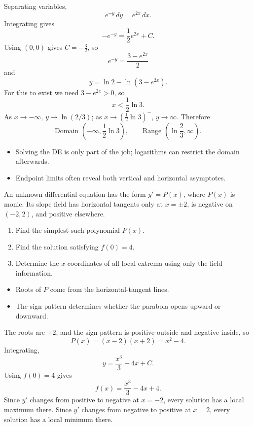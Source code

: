 \begin{solution}
Separating variables,
\[
e^{-y}\,dy=e^{2x}\,dx.
\]
Integrating gives
\[
-e^{-y}=\frac12e^{2x}+C.
\]
Using $(0,0)$ gives $C=-\frac32$, so
\[
e^{-y}=\frac{3-e^{2x}}{2}
\]
and
\[
\boxed{y=\ln 2-\ln(3-e^{2x})}.
\]
For this to exist we need $3-e^{2x}>0$, so
\[
\boxed{x<\frac12\ln3}.
\]
As $x\to-\infty$, $y\to\ln(2/3)$; as $x\to(\frac12\ln3)^-$, $y\to\infty$. Therefore
\[
\boxed{\text{Domain } \left(-\infty,\frac12\ln3\right), \qquad \text{Range } \left(\ln\frac23,\infty\right).}
\]
\end{solution}

\begin{takeaways}
\begin{itemize}[leftmargin=*]
    \item Solving the DE is only part of the job; logarithms can restrict the domain afterwards.
    \item Endpoint limits often reveal both vertical and horizontal asymptotes.
\end{itemize}
\end{takeaways}

\begin{problem}
An unknown differential equation has the form $y'=P(x)$, where $P(x)$ is monic. Its slope field has horizontal tangents only at $x=\pm2$, is negative on $(-2,2)$, and positive elsewhere.
\begin{enumerate}
    \item[\textbf{i}] Find the simplest such polynomial $P(x)$.
    \item[\textbf{ii}] Find the solution satisfying $f(0)=4$.
    \item[\textbf{iii}] Determine the $x$-coordinates of all local extrema using only the field information.
\end{enumerate}
\end{problem}

\begin{hint}
\begin{itemize}[leftmargin=*]
    \item Roots of $P$ come from the horizontal-tangent lines.
    \item The sign pattern determines whether the parabola opens upward or downward.
\end{itemize}
\end{hint}

\begin{solution}
The roots are $\pm2$, and the sign pattern is positive outside and negative inside, so
\[
\boxed{P(x)=(x-2)(x+2)=x^2-4}.
\]
Integrating,
\[
y=\frac{x^3}{3}-4x+C.
\]
Using $f(0)=4$ gives
\[
\boxed{f(x)=\frac{x^3}{3}-4x+4}.
\]
Since $y'$ changes from positive to negative at $x=-2$, every solution has a local maximum there. Since $y'$ changes from negative to positive at $x=2$, every solution has a local minimum there.
\end{solution}

